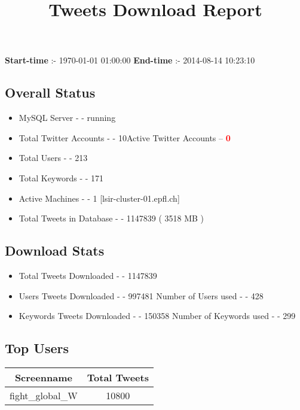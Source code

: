 \documentclass{article}\usepackage[T1]{fontenc}
\begin{document}
\title{\textbf{Tweets Download Report}}
               \date{}
                \maketitle
               \centerline{\textbf{Start-time} :- 1970-01-01 01:00:00 \hspace{40pt} \textbf{End-time} :- 2014-08-14 10:23:10}               \subsection*{Overall Status}                \begin{itemize}                \item MySQL Server - - running               \item Total Twitter Accounts - - 10\newline Active Twitter Accounts -- \textcolor{red}{\textbf{0}}               \item Total Users - - 213               \item Total Keywords - - 171               \item Active Machines - - 1 [lsir-cluster-01.epfl.ch]               \item Total Tweets in Database - - 1147839 ( 3518 MB )               \end{itemize}               \subsection*{Download Stats}                \begin{itemize}                \item Total Tweets Downloaded - - 1147839               \item Users Tweets Downloaded - - 997481 \newline Number of Users used - - 428               \item Keywords Tweets Downloaded - - 150358 \newline Number of Keywords used - - 299              \end{itemize}              \subsection*{Top Users}\begin{tabular}{|c|c|}         \hline         Screenname & Total Tweets \\ 
 \hline
fight\_global\_W & 10800\\ 

\end{tabular}
\end{document}
